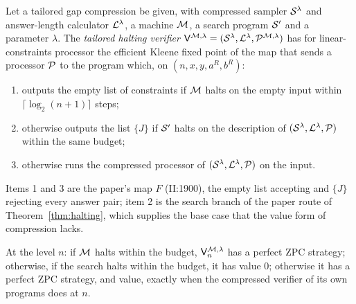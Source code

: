\begin{definition}
\label{def:tailored-halt-verifier}
\leanok
Let a tailored gap compression be given, with compressed sampler $\cal{S}^\lambda$ and
answer-length calculator $\cal{L}^\lambda$, a machine $\machine$, a search program $\cal{S}'$ and
a parameter $\lambda$. The \emph{tailored halting verifier}
$\verifier^{\machine,\lambda} = (\cal{S}^\lambda, \cal{L}^\lambda, \cal{P}^{\machine,\lambda})$ has
for linear-constraints processor the efficient Kleene fixed point of the map that sends a
processor $\cal{P}$ to the program which, on $(n, x, y, a^R, b^R)$:
\begin{enumerate}
\item outputs the empty list of constraints if $\machine$ halts on the empty input within
  $\lceil \log_2 (n+1) \rceil$ steps;
\item otherwise outputs the list $\{J\}$ if $\cal{S}'$ halts on the description of
  $(\cal{S}^\lambda, \cal{L}^\lambda, \cal{P})$ within the same budget;
\item otherwise runs the compressed processor of $(\cal{S}^\lambda, \cal{L}^\lambda, \cal{P})$ on
  the input.
\end{enumerate}
Items 1 and 3 are the paper's map $F$ (II:1900), the empty list accepting and $\{J\}$ rejecting
every answer pair; item 2 is the search branch of the paper route of Theorem~\ref{thm:halting},
which supplies the base case that the value form of compression lacks.
\end{definition}

\begin{lemma}
\label{lem:tailored-dhalt-values}
\leanok
At the level $n$: if $\machine$ halts within the budget, $\verifier^{\machine,\lambda}_n$ has a
perfect ZPC strategy; otherwise, if the search halts within the budget, it has value $0$;
otherwise it has a perfect ZPC strategy, and value, exactly when the compressed verifier of its
own programs does at $n$.
\end{lemma}


